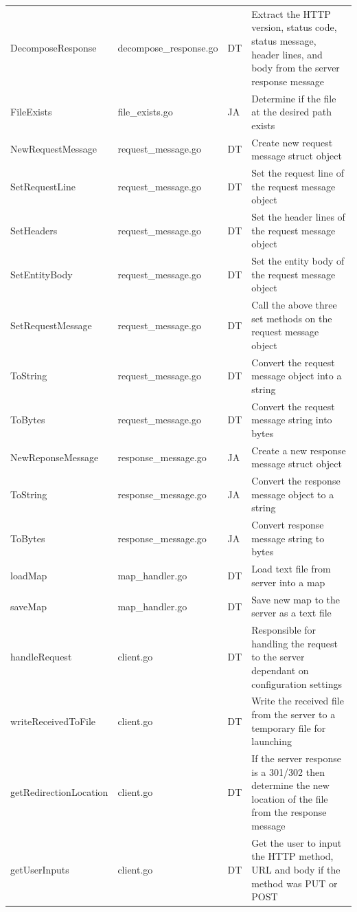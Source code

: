 \documentclass[10pt,twocolumn]{witseiepaper}
\begin{document}
\begin{table}[htbp]
\begin{tabular}{p{}| p{} | p{} | p{}}
				DecomposeResponse & decompose\_response.go & DT & Extract the HTTP version, status code, status message, header lines, and body from the server response message \\
				FileExists & file\_exists.go & JA & Determine if the file at the desired path exists \\
				NewRequestMessage & request\_message.go & DT & Create new request message struct object \\
				SetRequestLine & request\_message.go & DT & Set the request line of the request message object \\
				SetHeaders & request\_message.go & DT & Set the header lines of the request message object \\
				SetEntityBody & request\_message.go & DT & Set the entity body of the request message object \\
				SetRequestMessage & request\_message.go & DT & Call the above three set methods on the request message object \\
				ToString & request\_message.go & DT & Convert the request message object into a string \\
				ToBytes & request\_message.go & DT & Convert the request message string into bytes \\
				NewReponseMessage & response\_message.go & JA & Create a new response message struct object \\
				ToString & response\_message.go & JA & Convert the response message object to a string \\
				ToBytes & response\_message.go & JA & Convert response message string to bytes \\
				loadMap & map\_handler.go & DT & Load text file from server into a map \\
				saveMap & map\_handler.go & DT & Save new map to the server as a text file \\
				handleRequest & client.go &	DT & Responsible for handling the request to the server dependant on configuration settings \\
				writeReceivedToFile & client.go & DT &	Write the received file from the server to a temporary file for launching \\
				getRedirectionLocation & client.go &	DT & If the server response is a 301/302 then determine the new location of the file from the response message \\
				getUserInputs & client.go &	DT & Get the user to input the HTTP method, URL and body if the method was PUT or POST \\

\end{tabular}
\end{table}
\end{document}
